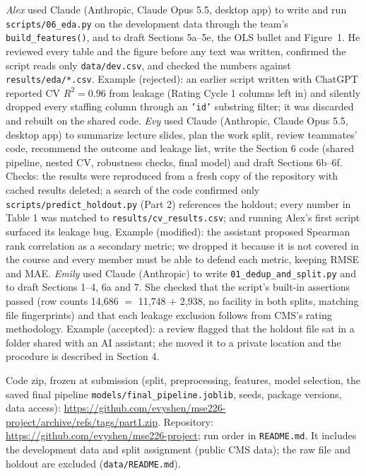 \documentclass[11pt]{article}
\makeatletter
\renewcommand\section{\@startsection{section}{1}{\z@}{-1.6ex \@plus -.5ex \@minus -.2ex}{0.8ex \@plus .2ex}{\normalfont\large\bfseries}}
\makeatother
\begin{document}
\section{AI tools}
\emph{Alex} used Claude (Anthropic, Claude Opus 5.5, desktop app) to write and run \texttt{scripts/06\_eda.py} on the development data through the team's \texttt{build\_features()}, and to draft Sections 5a--5e, the OLS bullet and Figure~1. He reviewed every table and the figure before any text was written, confirmed the script reads only \texttt{data/dev.csv}, and checked the numbers against \texttt{results/eda/*.csv}. Example (rejected): an earlier script written with ChatGPT reported CV $R^2=0.96$ from leakage (Rating Cycle 1 columns left in) and silently dropped every staffing column through an \texttt{'id'} substring filter; it was discarded and rebuilt on the shared code.
\emph{Evy} used Claude (Anthropic, Claude Opus 5.5, desktop app) to summarize lecture slides, plan the work split, review teammates' code, recommend the outcome and leakage list, write the Section 6 code (shared pipeline, nested CV, robustness checks, final model) and draft Sections 6b--6f. Checks: the results were reproduced from a fresh copy of the repository with cached results deleted; a search of the code confirmed only \texttt{scripts/predict\_holdout.py} (Part 2) references the holdout; every number in Table 1 was matched to \texttt{results/cv\_results.csv}; and running Alex's first script surfaced its leakage bug. Example (modified): the assistant proposed Spearman rank correlation as a secondary metric; we dropped it because it is not covered in the course and every member must be able to defend each metric, keeping RMSE and MAE.
\emph{Emily} used Claude (Anthropic) to write \texttt{01\_dedup\_and\_split.py} and to draft Sections 1--4, 6a and 7. She checked that the script's built-in assertions passed (row counts 14{,}686 $=$ 11{,}748 $+$ 2{,}938, no facility in both splits, matching file fingerprints) and that each leakage exclusion follows from CMS's rating methodology. Example (accepted): a review flagged that the holdout file sat in a folder shared with an AI assistant; she moved it to a private location and the procedure is described in Section 4.

\section{Code}
Code zip, frozen at submission (split, preprocessing, features, model selection, the saved final pipeline \texttt{models/final\_pipeline.joblib}, seeds, package versions, data access): \url{https://github.com/evyshen/mse226-project/archive/refs/tags/part1.zip}. Repository: \url{https://github.com/evyshen/mse226-project}; run order in \texttt{README.md}. It includes the development data and split assignment (public CMS data); the raw file and holdout are excluded (\texttt{data/README.md}).
\end{document}
